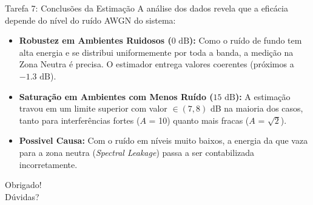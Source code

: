 \documentclass[10pt]{beamer}
\begin{document}
\begin{frame}{Tarefa 7: Conclusões da Estimação}
    A análise dos dados revela que a eficácia depende do nível do ruído AWGN do sistema:
    
    \begin{itemize}
        \item \textbf{Robustez em Ambientes Ruidosos ($0\text{ dB}$):} Como o
            ruído de fundo tem alta energia e se distribui uniformemente por
            toda a banda, a medição na Zona Neutra é precisa. O estimador
            entrega valores coerentes (próximos a $-1.3\text{ dB}$).
        \item \textbf{Saturação em Ambientes com Menos Ruído ($15\text{ dB}$):} A 
            estimação travou em um limite superior com valor $\in (7, 8)$
            dB na maioria dos casos, tanto para interferências fortes ($A$ =
            10) quanto mais fracas ($A$ = $\sqrt{2}$).
        \item \textbf{Possivel Causa:} Com o ruído em níveis muito baixos, a
            energia da que vaza para a zona neutra (\textit{Spectral Leakage})
            passa a ser contabilizada incorretamente.
    \end{itemize}
\end{frame}

\begin{frame}
    \centering
    \Huge Obrigado! \\
    \vfill
    \Large Dúvidas?
\end{frame}
\end{document}
